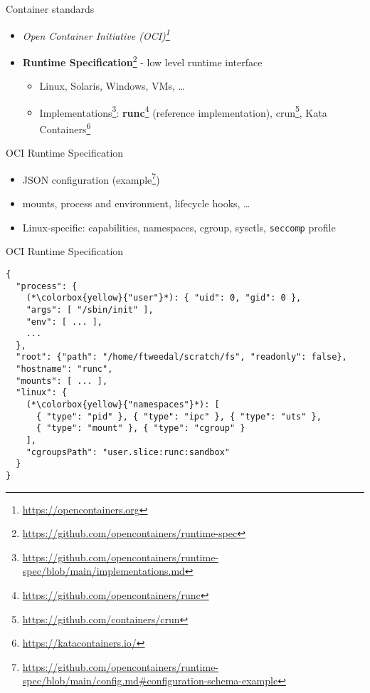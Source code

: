 \documentclass[ignorenonframetext,aspectratio=169,12pt]{beamer}
\begin{document}
\begin{frame}{Container standards}
\protect\hypertarget{container-standards}{}
\begin{itemize}
    \item {\em Open Container Initiative (OCI)\footnote{\url{https://opencontainers.org}}}
    \item {\bf Runtime Specification}\footnote{\url{https://github.com/opencontainers/runtime-spec}} - low level runtime interface
    \begin{itemize}
        \item Linux, Solaris, Windows, VMs, \ldots{}
        \item Implementations\footnote{\url{https://github.com/opencontainers/runtime-spec/blob/main/implementations.md}}:
          {\bf runc}\footnote{\url{https://github.com/opencontainers/runc}} (reference implementation),
          crun\footnote{\url{https://github.com/containers/crun}},
          Kata Containers\footnote{\url{https://katacontainers.io/}}
    \end{itemize}
\end{itemize}
\end{frame}

\begin{frame}{OCI Runtime Specification}
\protect\hypertarget{oci-runtime-spec}{}
\begin{itemize}
\item JSON configuration (example\footnote{\url{https://github.com/opencontainers/runtime-spec/blob/main/config.md\#configuration-schema-example}})
\item mounts, process and environment, lifecycle hooks, \ldots{}
\item Linux-specific: capabilities, namespaces, cgroup, sysctls,
      {\tt seccomp} profile
\end{itemize}
\end{frame}

\begin{frame}[fragile]{OCI Runtime Specification}
\protect\hypertarget{kubernetes-pod-spec-example}{}
\begin{lstlisting}[basicstyle=\ttfamily\footnotesize]
{
  "process": {
    (*\colorbox{yellow}{"user"}*): { "uid": 0, "gid": 0 },
    "args": [ "/sbin/init" ],
    "env": [ ... ],
    ...
  },
  "root": {"path": "/home/ftweedal/scratch/fs", "readonly": false},
  "hostname": "runc",
  "mounts": [ ... ],
  "linux": {
    (*\colorbox{yellow}{"namespaces"}*): [
      { "type": "pid" }, { "type": "ipc" }, { "type": "uts" },
      { "type": "mount" }, { "type": "cgroup" }
    ],
    "cgroupsPath": "user.slice:runc:sandbox"
  }
}
\end{lstlisting}
\end{frame}
\end{document}
